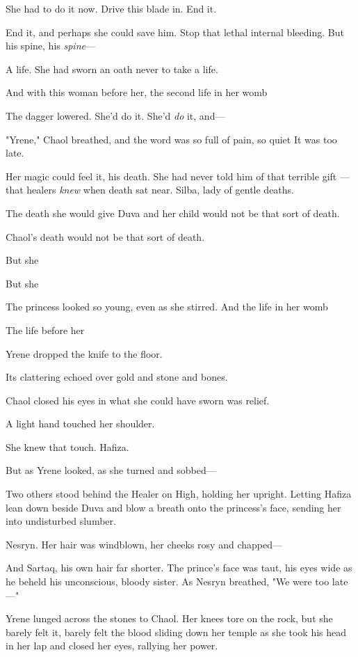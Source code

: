 She had to do it now. Drive this blade in. End it.

End it, and perhaps she could save him. Stop that lethal internal bleeding. But his spine, his \emph{spine}---

A life. She had sworn an oath never to take a life.

And with this woman before her, the second life in her womb 

The dagger lowered. She'd do it. She'd \emph{do} it, and---

"Yrene," Chaol breathed, and the word was so full of pain, so quiet
 It was too late.

Her magic could feel it, his death. She had never told him of that terrible gift ---that healers \emph{knew} when death sat near. Silba, lady of gentle deaths.

The death she would give Duva and her child would not be that sort of death.

Chaol's death would not be that sort of death.

But she 

But she 

The princess looked so young, even as she stirred. And the life in her womb



The life before her 

Yrene dropped the knife to the floor.

Its clattering echoed over gold and stone and bones.

Chaol closed his eyes in what she could have sworn was relief.

A light hand touched her shoulder.

She knew that touch. Hafiza.

But as Yrene looked, as she turned and sobbed---

Two others stood behind the Healer on High, holding her upright. Letting Hafiza lean down beside Duva and blow a breath onto the princess's face, sending her into undisturbed slumber.

Nesryn. Her hair was windblown, her cheeks rosy and chapped---

And Sartaq, his own hair far shorter. The prince's face was taut, his eyes wide as he beheld his unconscious, bloody sister. As Nesryn breathed, "We were too late---"

Yrene lunged across the stones to Chaol. Her knees tore on the rock, but she barely felt it, barely felt the blood sliding down her temple as she took his head in her lap and closed her eyes, rallying her power.

